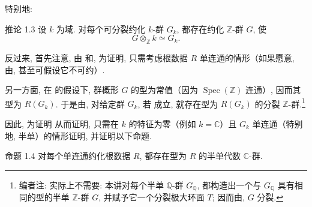 特别地:

\begin{sgastatement}{推论 1.3}
设 \(k\) 为域. 对每个可分裂约化 \(k\)-群 \(G_k\), 都存在约化 \(\mathbb Z\)-群 \(G\), 使
\[
  G\otimes_{\mathbb Z}k\simeq G_k.
\]
\end{sgastatement}

反过来, 首先注意, 由 和, 为证明, 只需考虑根数据 \(R\) 单连通的情形（如果愿意, 由, 甚至可假设它不可约）.

另一方面, 在 的假设下, 群概形 \(G\) 的型为常值（因为 \(\operatorname{Spec}(\mathbb Z)\) 连通）, 因而其型为 \(R(G_k)\). 于是由, 对给定群 \(G_k\), 若 成立, 就存在型为 \(R(G_k)\) 的分裂 \(\mathbb Z\)-群.\footnote{编者注: 实际上不需要: 本讲对每个半单 \(\mathbb Q\)-群 \(G_{\mathbb Q}\), 都构造出一个与 \(G_{\mathbb Q}\) 具有相同的型的半单 \(\mathbb Z\)-群 \(G\), 并赋予它一个分裂极大环面 \(T\); 因而由, \(G\) 分裂.}

因此, 为证明 从而证明, 只需在 \(k\) 的特征为零（例如 \(k=\mathbb C\)）且 \(G_k\) 单连通（特别地, 半单）的情形证明, 并证明以下命题.

\begin{sgastatement}{命题 1.4}
对每个单连通约化根数据 \(R\), 都存在型为 \(R\) 的半单代数 \(\mathbb C\)-群.
\end{sgastatement}

